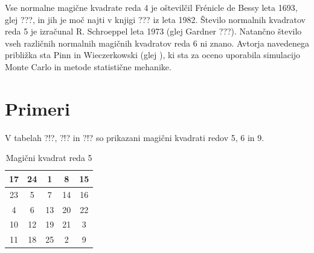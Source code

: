 \documentclass[a4paper,12pt]{article}
\begin{document}

Vse normalne magične kvadrate reda 4 je oštevilčil Frénicle de Bessy
leta 1693, glej ???, in jih je moč najti v knjigi ???
iz leta 1982. Število normalnih kvadratov reda 5 je izračunal
R. Schroeppel leta 1973 (glej Gardner ???).
Natančno število vseh različnih normalnih magičnih kvadratov reda 6 ni znano.
Avtorja navedenega približka sta Pinn in Wieczerkowski (glej \cite{bessy,berlekamp, gardner, pinn}), ki
sta za oceno uporabila simulacijo Monte Carlo in metode statistične mehanike.


\section{Primeri}

V tabelah ?!?, ?!? in ?!? so prikazani
magični kvadrati redov 5, 6 in 9.

   
   \begin{table}
      \label{mag5}
      \caption{Magični kvadrat reda 5}
      \begin{tabular}{ccccc}
         17 & 24 &  1 &  8 & 15 \\\hline
         23 &  5 &  7 & 14 & 16 \\\hline
          4 &  6 & 13 & 20 & 22 \\\hline
         10 & 12 & 19 & 21 &  3 \\\hline
         11 & 18 & 25 &  2 &  9 \\\hline
      \end{tabular}
   \end{table}

\end{document}
